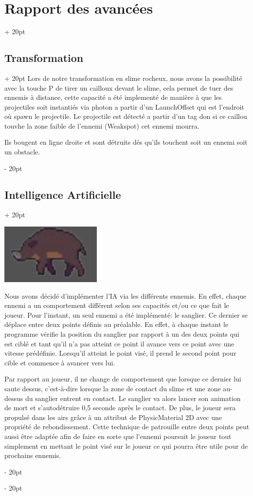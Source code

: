 \documentclass[a4paper, 12pt, twoside]{article}
\newcommand{\ind}[1][20pt]{\advance\leftskip + #1}
\newcommand{\deind}[1][20pt]{\advance\leftskip - #1}
\newenvironment{indt}[2][20pt]{#2 \par \ind[#1]}{\par \deind} %
\begin{document}
\begin{indt}{\section{Rapport des avancées}}
\begin{indt}{\subsection{Transformation}}
            Lors de notre transformation en slime rocheux, nous avons la possibilité avec la touche P de tirer un cailloux devant le slime, cela permet de tuer des ennemis à distance, cette capacité a été implementé de manière à que les projectiles soit instantiés via photon a partir d'un LaunchOffset qui est l'endroit où spawn le projectile. Le projectile est détecté a partir d'un tag don si ce caillou touvhe la zone faible de l'ennemi (Weakspot) cet ennemi mourra.

            Ils bougent en ligne droite et sont détruits dés qu'ils touchent soit un ennemi soit un obstacle.

        \end{indt}

        \begin{indt}{\subsection{Intelligence Artificielle}}
            \begin{center}
                \includegraphics[width=0.5\linewidth]{sanglier.png}
            \end{center}

            Nous avons décidé d'implémenter l'IA via les différents ennemis. En effet, chaque ennemi a un comportement différent selon ses capacités et/ou ce que fait le joueur. Pour l'instant, un seul ennemi a été implémenté: le sanglier. Ce dernier se déplace entre deux points définis au préalable. En effet, à chaque instant le programme vérifie la position du sanglier par rapport à un des deux points qui est ciblé et tant qu'il n'a pas atteint ce point  il avance vers ce point avec une vitesse prédéfinie. Lorsqu'il atteint le point visé, il prend le second point pour cible et commence à avancer vers lui. 

            Par rapport au joueur, il ne change de comportement que lorsque ce dernier lui saute dessus, c'est-à-dire lorsque la zone de contact du slime et une zone au-dessus du sanglier entrent en contact. Le sanglier va alors lancer son animation de mort et s'autodétruire 0,5 seconde après le contact. De plus, le joueur sera propulsé dans les airs grâce à un attribut de PhysicMaterial 2D avec une propriété de rebondissement. Cette technique de patrouille entre deux points  peut aussi être adaptée afin de faire en sorte que l'ennemi poursuit le joueur tout simplement en mettant le point visé sur le joueur ce qui pourra être utile pour de prochains ennemis. 


\end{indt}
\end{indt}
\end{document}
